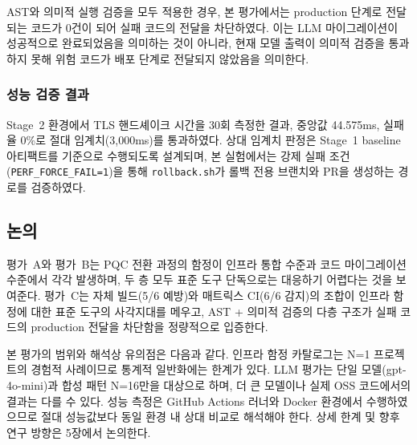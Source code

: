 AST와 의미적 실행 검증을 모두 적용한 경우, 본 평가에서는 production 단계로 전달되는 코드가 0건이 되어 실패 코드의 전달을 차단하였다.
이는 LLM 마이그레이션이 성공적으로 완료되었음을 의미하는 것이 아니라, 현재 모델 출력이 의미적 검증을 통과하지 못해 위험 코드가 배포 단계로 전달되지 않았음을 의미한다.

\subsubsection{성능 검증 결과}

Stage~2 환경에서 TLS 핸드셰이크 시간을 30회 측정한 결과, 중앙값 44.575ms, 실패율 0\%로 절대 임계치(3,000ms)를 통과하였다.
상대 임계치 판정은 Stage~1 baseline 아티팩트를 기준으로 수행되도록 설계되며, 본 실험에서는 강제 실패 조건(\texttt{PERF\_FORCE\_FAIL=1})을 통해 \texttt{rollback.sh}가 롤백 전용 브랜치와 PR을 생성하는 경로를 검증하였다.

\subsection{논의}

평가~A와 평가~B는 PQC 전환 과정의 함정이 인프라 통합 수준과 코드 마이그레이션 수준에서 각각 발생하며, 두 층 모두 표준 도구 단독으로는 대응하기 어렵다는 것을 보여준다.
평가~C는 자체 빌드(5/6 예방)와 매트릭스 CI(6/6 감지)의 조합이 인프라 함정에 대한 표준 도구의 사각지대를 메우고, AST + 의미적 검증의 다층 구조가 실패 코드의 production 전달을 차단함을 정량적으로 입증한다.

본 평가의 범위와 해석상 유의점은 다음과 같다.
인프라 함정 카탈로그는 N=1 프로젝트의 경험적 사례이므로 통계적 일반화에는 한계가 있다.
LLM 평가는 단일 모델(gpt-4o-mini)과 합성 패턴 N=16만을 대상으로 하며, 더 큰 모델이나 실제 OSS 코드에서의 결과는 다를 수 있다.
성능 측정은 GitHub Actions 러너와 Docker 환경에서 수행하였으므로 절대 성능값보다 동일 환경 내 상대 비교로 해석해야 한다.
상세 한계 및 향후 연구 방향은 5장에서 논의한다.